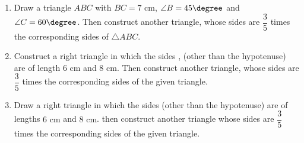 \begin{enumerate}
\item Draw a triangle $ABC$ with $BC = 7 \text{ cm}$, $\angle B = 45 \degree$ and $\angle C = 60 \degree$. Then construct another triangle, whose sides are $\dfrac{3}{5}$ times the corresponding sides of $\triangle ABC$. 
\item Construct a right triangle in which the sides , (other than the hypotenuse) are of length $6\text{ cm}$ and $8\text{ cm}$. Then construct another triangle, whose sides are $\dfrac{3}{5}$ times the corresponding sides of the given triangle. 
\item Draw a right triangle in which the sides (other than the hypotenuse) are of lengths $6\text{ cm}$ and $8\text{ cm}$. then construct another triangle whose sides are $\dfrac{3}{5}$ times the corresponding sides of the given triangle. 
\end{enumerate}
